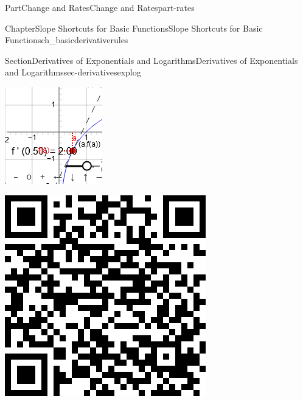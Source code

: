 \documentclass[oneside,10pt,]{tufte-book}
\numberwithin{equation}{chapter}
\begin{document}
\begin{partptx}{Part}{Change and Rates}{}{Change and Rates}{}{}{part-rates}
\begin{chapterptx}{Chapter}{Slope Shortcuts for Basic Functions}{}{Slope Shortcuts for Basic Functions}{}{}{ch_basicderivativerules}
\begin{sectionptx}{Section}{Derivatives of Exponentials and Logarithms}{}{Derivatives of Exponentials and Logarithms}{}{}{sec-derivativesexplog}
\begin{sidebyside}{2}{0.075}{0.075}{0.17}
\begin{sbspanel}{0.47}
\includegraphics[width=\linewidth]{external/jsxgraph-findingslopefromtangent-exercise2d.png}
\end{sbspanel}%
\begin{sbspanel}{0.21}%
\includegraphics[width=\linewidth]{generated/qrcode/sec-derivativesexplog-7-5.png}

\end{sbspanel}
\end{sidebyside}
\end{sectionptx}
\end{chapterptx}
\end{partptx}
\end{document}
